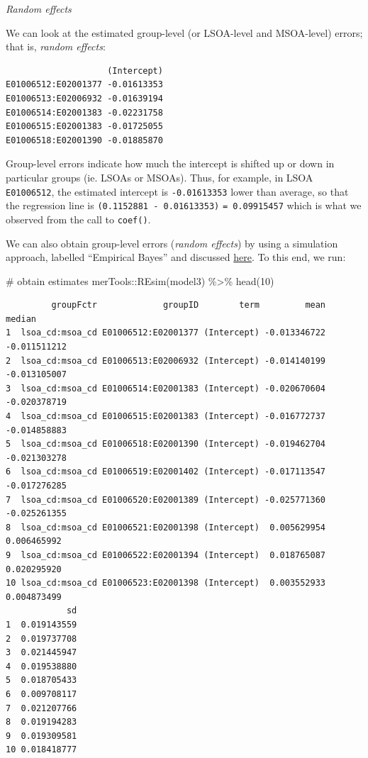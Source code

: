 \documentclass[
  letterpaper,
  DIV=11,
  numbers=noendperiod,
  oneside]{scrreprt}
\newenvironment{Shaded}{\begin{snugshade}}{\end{snugshade}}
\newcommand{\CommentTok}[1]{\textcolor[rgb]{0.37,0.37,0.37}{#1}}
\newcommand{\DecValTok}[1]{\textcolor[rgb]{0.68,0.00,0.00}{#1}}
\newcommand{\FunctionTok}[1]{\textcolor[rgb]{0.28,0.35,0.67}{#1}}
\newcommand{\NormalTok}[1]{\textcolor[rgb]{0.00,0.23,0.31}{#1}}
\newcommand{\OtherTok}[1]{\textcolor[rgb]{0.00,0.23,0.31}{#1}}
\newcommand{\SpecialCharTok}[1]{\textcolor[rgb]{0.37,0.37,0.37}{#1}}
\begin{document}
\emph{Random effects}

We can look at the estimated group-level (or LSOA-level and MSOA-level)
errors; that is, \emph{random effects}:

\begin{Shaded}
\end{Shaded}

\begin{verbatim}
                    (Intercept)
E01006512:E02001377 -0.01613353
E01006513:E02006932 -0.01639194
E01006514:E02001383 -0.02231758
E01006515:E02001383 -0.01725055
E01006518:E02001390 -0.01885870
\end{verbatim}

Group-level errors indicate how much the intercept is shifted up or down
in particular groups (ie. LSOAs or MSOAs). Thus, for example, in LSOA
\texttt{E01006512}, the estimated intercept is \texttt{-0.01613353}
lower than average, so that the regression line is
\texttt{(0.1152881\ -\ 0.01613353)} \texttt{=\ 0.09915457} which is what
we observed from the call to \texttt{coef()}.

We can also obtain group-level errors (\emph{random effects}) by using a
simulation approach, labelled ``Empirical Bayes'' and discussed
\href{https://stat.ethz.ch/pipermail/r-sig-mixed-models/2009q4/002984.html}{here}.
To this end, we run:

\begin{Shaded}
\begin{Highlighting}[]
\CommentTok{\# obtain estimates}
\NormalTok{merTools}\SpecialCharTok{::}\FunctionTok{REsim}\NormalTok{(model3) }\SpecialCharTok{\%\textgreater{}\%} 
  \FunctionTok{head}\NormalTok{(}\DecValTok{10}\NormalTok{)}
\end{Highlighting}
\end{Shaded}

\begin{verbatim}
         groupFctr             groupID        term         mean       median
1  lsoa_cd:msoa_cd E01006512:E02001377 (Intercept) -0.013346722 -0.011511212
2  lsoa_cd:msoa_cd E01006513:E02006932 (Intercept) -0.014140199 -0.013105007
3  lsoa_cd:msoa_cd E01006514:E02001383 (Intercept) -0.020670604 -0.020378719
4  lsoa_cd:msoa_cd E01006515:E02001383 (Intercept) -0.016772737 -0.014858883
5  lsoa_cd:msoa_cd E01006518:E02001390 (Intercept) -0.019462704 -0.021303278
6  lsoa_cd:msoa_cd E01006519:E02001402 (Intercept) -0.017113547 -0.017276285
7  lsoa_cd:msoa_cd E01006520:E02001389 (Intercept) -0.025771360 -0.025261355
8  lsoa_cd:msoa_cd E01006521:E02001398 (Intercept)  0.005629954  0.006465992
9  lsoa_cd:msoa_cd E01006522:E02001394 (Intercept)  0.018765087  0.020295920
10 lsoa_cd:msoa_cd E01006523:E02001398 (Intercept)  0.003552933  0.004873499
            sd
1  0.019143559
2  0.019737708
3  0.021445947
4  0.019538880
5  0.018705433
6  0.009708117
7  0.021207766
8  0.019194283
9  0.019309581
10 0.018418777
\end{verbatim}
\end{document}
